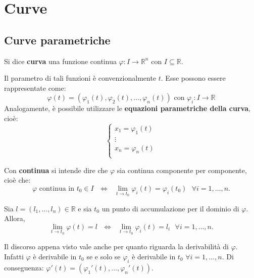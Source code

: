 \chapter{Curve}
\section{Curve parametriche}
\begin{definition}
    Si dice \textbf{curva} una funzione continua $\varphi:I\to\mathbb{R}^n$ con $I\subseteq \mathbb{R}$.
\end{definition}
Il parametro di tali funzioni è convenzionalmente $t$. Esse possono essere rappresentate come:
\begin{equation*}
    \varphi(t)=(\varphi_1(t), \varphi_2(t), \dots, \varphi_n(t)) \text{ con }\varphi_i:I \to \mathbb{R}
\end{equation*}
Analogamente, è possibile utilizzare le \textbf{equazioni parametriche della curva}, cioè:
\begin{equation*}
   \begin{cases}
     x_1=\varphi_1(t)\\
     \vdots\\
     x_n=\varphi_n(t)\\
    \end{cases}
\end{equation*}
\begin{oss}
    Con \textbf{continua} si intende dire che $\varphi$ sia continua componente per componente, cioè che:
    \begin{equation*}
        \varphi \text{ continua in } t_0 \in I \text{ } \iff \text{ } \lim_{t \to t_0}{\varphi_i(t)}=\varphi_i(t_0) \text{ }\forall i=1, \dots, n.
    \end{equation*} 
\end{oss}
\begin{oss}
    Sia $l=(l_1, \dots, l_n)\in\mathbb{R}$ e sia $t_0$ un punto di accumulazione per il dominio di $\varphi$. Allora,
    \begin{equation*}
        \lim_{t \to t_0}{\varphi(t)}=l \text{ }\iff \text{ }\lim_{t \to t_0}{\varphi_i(t)}=l_i \text{ } \forall i = 1, \dots, n.
    \end{equation*}
\end{oss}
\begin{oss}
    Il discorso appena visto vale anche per quanto riguarda la derivabilità di $\varphi$. Infatti $\varphi$ è derivabile in $t_0$ se e solo se $\varphi_i$ è derivabile in $t_0$ $\forall i=1, \dots, n$. Di conseguenza: $\varphi'(t)=(\varphi_1'(t), \dots, \varphi_n'(t))$.
\end{oss}
